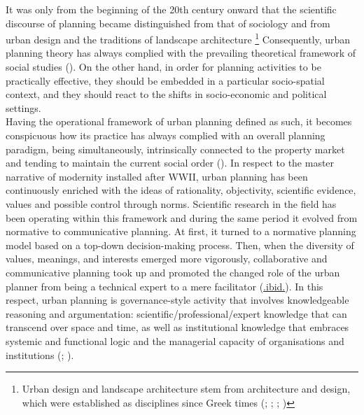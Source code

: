 \documentclass[11pt]{report}
\begin{document}
{{{It was only from the beginning of the 20th century onward that the scientific discourse of planning became distinguished from that of sociology and from urban design and the traditions of landscape architecture
\footnote{Urban design and landscape architecture stem from architecture and design, which were established as disciplines since Greek times
(\href{Handlin}{\citealt{Handlin and Burchard, 1966}};
\href{Allmedinger}{\citealt{allmendinger_planning_2002}};
\href{Hall}{\citealt{hall_cities_2002}};
\href{Van}{\citealt{van_assche_co-evolutions_2013}})} 
Consequently, urban planning theory has always complied with the prevailing theoretical framework of social studies (\href{Portugali}{\citealt{portugali_complexity_2011}}).
On the other hand, in order for planning activities to be practically effective, they should be embedded in a particular socio-spatial context, and they should react to the shifts in socio-economic and political settings.
\\

Having the operational framework of urban planning defined as such, it becomes conspicuous how its practice has always complied with an overall planning paradigm, being simultaneously, intrinsically  connected to the property  market and tending to maintain the current social order (\href{Taylor}{\citealt{taylor_urban_2006}}). 
In respect to the master narrative of modernity installed after WWII, urban planning has been continuously enriched with the ideas of rationality, objectivity, scientific evidence, values and possible control through norms. Scientific research in the field has been operating within this framework and during the same period it evolved from normative to communicative planning. At first, it turned to a normative planning model based on a top-down decision-making process. Then, when the diversity of values, meanings, and interests emerged more vigorously, collaborative and communicative planning took up and promoted the changed role of the urban planner from being a technical expert to a mere facilitator (\href{Taylor}{.ibid.}).
In this respect, urban planning is governance-style activity that involves knowledgeable reasoning and argumentation: scientific/professional/expert knowledge that can transcend over space and time, as well as institutional knowledge that embraces systemic and functional logic and the managerial capacity of organisations and institutions (\href{Healey}{\citealt{healey_collaborative_1997}}; \href{Getimis}{\citealt{getimis_comparing_2012}}).
\\ 

}}}
\end{document}
